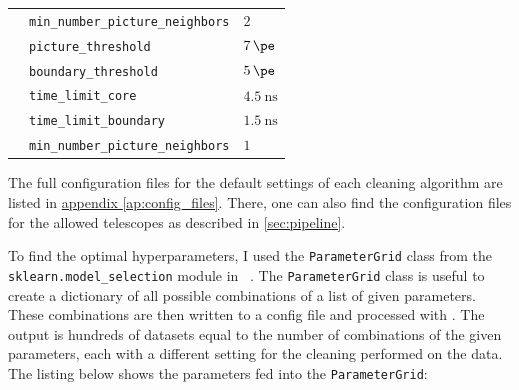 \begin{table}
{\begin{tabular}{l l l}
                    & \texttt{min\_number\_picture\_neighbors}  & \qquad\(\num{2}\) \\
        \addlinespace[0.5em]
        \tcc{}      & \texttt{picture\_threshold}               & \qquad\(\SI{7}{\pe}\) \\
                    & \texttt{boundary\_threshold}              & \qquad\(\SI{5}{\pe}\) \\
                    & \texttt{time\_limit\_core}                & \qquad\(\SI{4.5}{\nano\second}\) \\
                    & \texttt{time\_limit\_boundary}            & \qquad\(\SI{1.5}{\nano\second}\) \\
                    & \texttt{min\_number\_picture\_neighbors}  & \qquad\(\num{1}\) \\
  \end{tabular}}
\end{table}
The full configuration files for the default settings of each cleaning algorithm are listed in
\hyperref[ap:config_files]{appendix \ref{ap:config_files}}. There, one can also find the configuration files for the allowed telescopes
as described in \autoref{sec:pipeline}.

To find the optimal hyperparameters, I used the \texttt{ParameterGrid} class from the
\texttt{sklearn.model\_selection} module in \sklearn{}~\cite{scikit-learn}. The \texttt{ParameterGrid} class is useful to create a
dictionary of all possible combinations of a list of given parameters. These combinations are then
written to a config file and processed with \ctapipe{}. The output is hundreds of datasets equal to
the number of combinations of the given parameters, each with a different setting for the cleaning
performed on the data. The listing below shows the parameters fed into the \texttt{ParameterGrid}:
\begin{mdframed}[backgroundcolor=white!20!black,leftmargin=0cm,rightmargin=0cm, skipabove=0pt, innerleftmargin=0,innerrightmargin=0,]
\end{mdframed}

